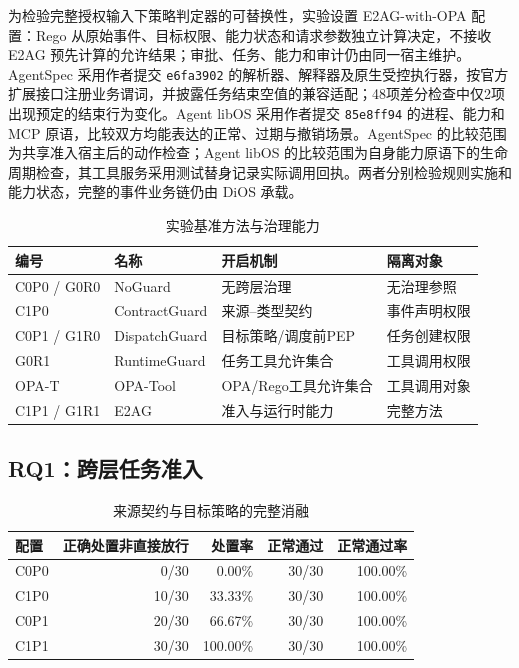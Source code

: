 为检验完整授权输入下策略判定器的可替换性，实验设置 E2AG-with-OPA 配置：Rego 从原始事件、目标权限、能力状态和请求参数独立计算决定，不接收 E2AG 预先计算的允许结果；审批、任务、能力和审计仍由同一宿主维护。AgentSpec 采用作者提交 \texttt{e6fa3902} 的解析器、解释器及原生受控执行器，按官方扩展接口注册业务谓词，并披露任务结束空值的兼容适配；48项差分检查中仅2项出现预定的结束行为变化。Agent libOS 采用作者提交 \texttt{85e8ff94} 的进程、能力和 MCP 原语，比较双方均能表达的正常、过期与撤销场景。AgentSpec 的比较范围为共享准入宿主后的动作检查；Agent libOS 的比较范围为自身能力原语下的生命周期检查，其工具服务采用测试替身记录实际调用回执。两者分别检验规则实施和能力状态，完整的事件业务链仍由 DiOS 承载。

\begin{table}[htbp]
\centering
\caption{实验基准方法与治理能力}
\label{tab:baselines-v11}
\small
\begin{tabular}{llll}
\toprule
编号 & 名称 & 开启机制 & 隔离对象 \\
\midrule
C0P0 / G0R0 & NoGuard & 无跨层治理 & 无治理参照 \\
C1P0 & ContractGuard & 来源--类型契约 & 事件声明权限 \\
C0P1 / G1R0 & DispatchGuard & 目标策略/调度前PEP & 任务创建权限 \\
G0R1 & RuntimeGuard & 任务工具允许集合 & 工具调用权限 \\
OPA-T & OPA-Tool & OPA/Rego工具允许集合 & 工具调用对象 \\
C1P1 / G1R1 & E2AG & 准入与运行时能力 & 完整方法 \\
\bottomrule
\end{tabular}
\end{table}

\subsection{RQ1：跨层任务准入}

\begin{table}[htbp]
\centering
\caption{来源契约与目标策略的完整消融}
\label{tab:rq1-v11}
\small
\begin{tabular}{lrrrr}
\toprule
配置 & 正确处置非直接放行 & 处置率 & 正常通过 & 正常通过率 \\
\midrule
C0P0 & 0/30 & 0.00\% & 30/30 & 100.00\% \\
C1P0 & 10/30 & 33.33\% & 30/30 & 100.00\% \\
C0P1 & 20/30 & 66.67\% & 30/30 & 100.00\% \\
C1P1 & 30/30 & 100.00\% & 30/30 & 100.00\% \\
\bottomrule
\end{tabular}
\end{table}

